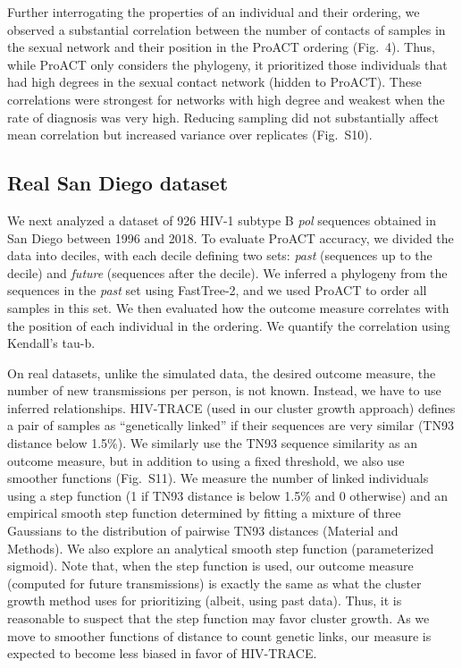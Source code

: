 \documentclass[a4paper,11pt]{article}
\newcommand{\PLWH}{sample\xspace}
\begin{document}
Further interrogating the properties of an individual and their ordering, we observed a substantial correlation between the number of contacts of \PLWH{s} in the sexual network and their position in the ProACT ordering (Fig.~4). 
Thus, while ProACT only considers the phylogeny, it  prioritized those individuals that had high degrees in the sexual contact network (hidden to ProACT). 
These correlations were strongest for networks with high degree and weakest when the rate of diagnosis was very high. 
Reducing sampling did not substantially affect mean correlation but increased variance over replicates (Fig.~S10).





\subsection{Real San Diego dataset}
We next analyzed a dataset of 926 HIV-1 subtype B \textit{pol} sequences obtained in San Diego between 1996 and 2018.
To evaluate ProACT accuracy,
we divided the data into deciles, with each decile defining two sets: \textit{past} (sequences up to the decile) and \textit{future} (sequences after the decile). We inferred a phylogeny from the sequences  in the \textit{past} set using FastTree-2,\supercite{Price2010} %
and we used ProACT to order all \PLWH{s} in this set. 
We then evaluated how the  outcome measure correlates with the position of each individual in the ordering. 
We quantify the correlation using Kendall's tau-b.

On real datasets, unlike the simulated data, the desired outcome measure, the number of new transmissions per person, is not known. 
Instead, we have to use inferred relationships.
HIV-TRACE (used in our cluster growth approach) defines
a pair of \PLWH{s} as ``genetically linked''
if their sequences are very similar (TN93 distance below 1.5\%).
We similarly use the TN93 sequence similarity as an outcome measure, but in addition to using a fixed threshold, we also use smoother functions (Fig.~S11).
We measure the number of linked individuals using a step function (1 if TN93 distance is below 1.5\% and 0 otherwise) 
and an empirical smooth step function determined by fitting a mixture of three Gaussians to the distribution of pairwise TN93 distances (Material and Methods).
We also explore an analytical smooth step function (parameterized sigmoid).  
Note that, when the step function is used, our outcome measure (computed for future transmissions) is exactly the same as what the cluster growth method uses for prioritizing (albeit, using past data). 
Thus, it is reasonable to suspect that the step function may favor cluster growth. 
As we move to smoother functions of distance to count genetic links, our measure is expected to become less biased in favor of HIV-TRACE. 
\end{document}
